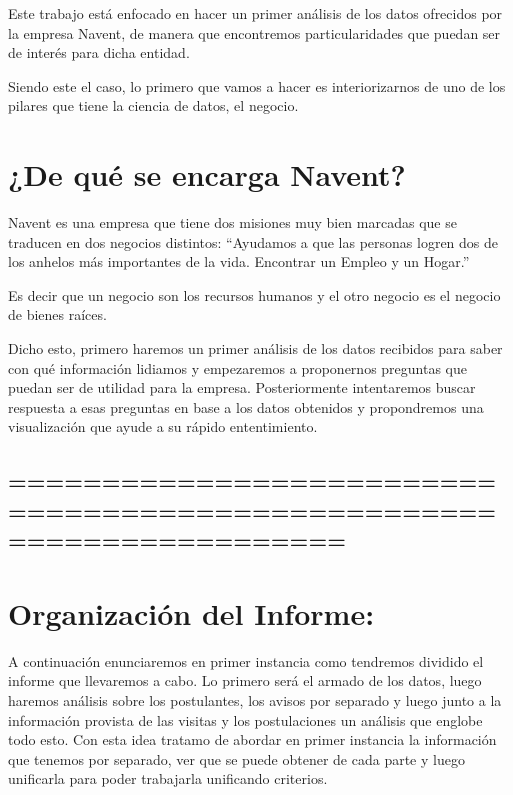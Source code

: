 \documentclass[11pt]{article}
\begin{document}
Este trabajo está enfocado en hacer un primer análisis de los datos
ofrecidos por la empresa Navent, de manera que encontremos
particularidades que puedan ser de interés para dicha entidad.

Siendo este el caso, lo primero que vamos a hacer es interiorizarnos de
uno de los pilares que tiene la ciencia de datos, el negocio.

\hypertarget{de-quuxe9-se-encarga-navent}{%
\section{¿De qué se encarga Navent?}\label{de-quuxe9-se-encarga-navent}}

Navent es una empresa que tiene dos misiones muy bien marcadas que se
traducen en dos negocios distintos: ``Ayudamos a que las personas logren
dos de los anhelos más importantes de la vida. Encontrar un Empleo y un
Hogar.''

Es decir que un negocio son los recursos humanos y el otro negocio es el
negocio de bienes raíces.

Dicho esto, primero haremos un primer análisis de los datos recibidos
para saber con qué información lidiamos y empezaremos a proponernos
preguntas que puedan ser de utilidad para la empresa. Posteriormente
intentaremos buscar respuesta a esas preguntas en base a los datos
obtenidos y propondremos una visualización que ayude a su rápido
ententimiento.

    \hypertarget{section}{%
\subsection{======================================================================}\label{section}}

\hypertarget{organizaciuxf3n-del-informe}{%
\section{Organización del Informe:}\label{organizaciuxf3n-del-informe}}

A continuación enunciaremos en primer instancia como tendremos dividido
el informe que llevaremos a cabo. Lo primero será el armado de los
datos, luego haremos análisis sobre los postulantes, los avisos por
separado y luego junto a la información provista de las visitas y los
postulaciones un análisis que englobe todo esto. Con esta idea tratamo
de abordar en primer instancia la información que tenemos por separado,
ver que se puede obtener de cada parte y luego unificarla para poder
trabajarla unificando criterios.
\end{document}
